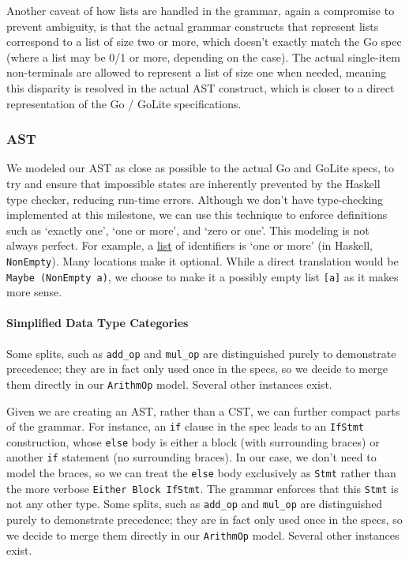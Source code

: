 \documentclass[11pt]{article}
\begin{document}
Another caveat of how lists are handled in the grammar, again a
compromise to prevent ambiguity, is that the actual grammar constructs
that represent lists correspond to a list of size two or more, which
doesn't exactly match the Go spec (where a list may be 0/1 or more,
depending on the case). The actual single-item non-terminals are allowed
to represent a list of size one when needed, meaning this disparity
is resolved in the actual AST construct, which is closer to a direct
representation of the Go / GoLite specifications.
\subsubsection{AST}
We modeled our AST as close as possible to the actual Go and
GoLite specs, to try and ensure that impossible states are inherently
prevented by the Haskell type checker, reducing run-time errors.
Although we don't have type-checking implemented at this milestone,
we can use this technique to enforce definitions such as
`exactly one', `one or more', and `zero or one'. This modeling is
not always perfect. For example, a \href{https://golang.org/ref/spec\#IdentifierList}{list}
of identifiers is `one or more' (in Haskell, \texttt{NonEmpty}). Many locations
make it optional. While a direct translation would be \texttt{Maybe (NonEmpty a)},
we choose to make it a possibly empty list \texttt{[a]} as it makes more sense.
\paragraph{Simplified Data Type Categories}
Some splits, such as \texttt{add\_op} and \texttt{mul\_op} are distinguished
purely to demonstrate precedence; they are in fact only used once
in the specs, so we decide to merge them directly in our \texttt{ArithmOp}
model. Several other instances exist.

Given we are creating an AST, rather than a CST, we can further
compact parts of the grammar. For instance, an \texttt{if} clause in the
spec leads to an \texttt{IfStmt} construction, whose \texttt{else} body is either
a block (with surrounding braces) or another \texttt{if} statement (no
surrounding braces). In our case, we don't need to model the braces,
so we can treat the \texttt{else} body exclusively as \texttt{Stmt} rather than
the more verbose \texttt{Either Block IfStmt}. The grammar enforces that
this \texttt{Stmt} is not any other type.
Some splits, such as \texttt{add\_op} and \texttt{mul\_op} are distinguished
purely to demonstrate precedence; they are in fact only used once
in the specs, so we decide to merge them directly in our \texttt{ArithmOp}
model. Several other instances exist.
\end{document}
